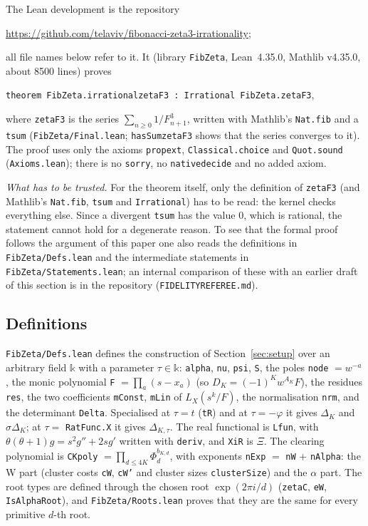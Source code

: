 \documentclass[11pt]{amsart}
\theoremstyle{definition}
\theoremstyle{remark}
\numberwithin{equation}{section}
\newcommand{\lean}[1]{{\def\_{\textunderscore\allowbreak}\texttt{#1}}}
\begin{document}
The Lean development is the repository
\begin{center}
\url{https://github.com/telaviv/fibonacci-zeta3-irrationality};
\end{center}
all file names below refer to it. It (library \lean{FibZeta}, Lean~4.35.0, Mathlib v4.35.0, about 8500 lines) proves
\begin{center}
\lean{theorem FibZeta.irrational\_zetaF3 : Irrational FibZeta.zetaF3},
\end{center}
where \lean{zetaF3} is the series $\sum_{n\ge0}1/F_{n+1}^3$, written with Mathlib's \lean{Nat.fib} and a \lean{tsum}
(\lean{FibZeta/Final.lean}; \lean{hasSum\_zetaF3} shows that the series converges to it). The proof uses only the
axioms \lean{propext}, \lean{Classical.choice} and \lean{Quot.sound} (\lean{Axioms.lean}); there is no \lean{sorry},
no \lean{native\_decide} and no added axiom.

\emph{What has to be trusted.} For the theorem itself, only the definition of \lean{zetaF3} (and Mathlib's
\lean{Nat.fib}, \lean{tsum} and \lean{Irrational}) has to be read: the kernel checks everything else. Since a divergent
\lean{tsum} has the value $0$, which is rational, the statement cannot hold for a degenerate reason. To see that the
formal proof follows the argument of this paper one also reads the definitions in \lean{FibZeta/Defs.lean} and the
intermediate statements in \lean{FibZeta/Statements.lean}; an internal comparison of these with an earlier draft of
this section is in the repository (\lean{FIDELITY\_REFEREE.md}).

\subsection*{Definitions}
\lean{FibZeta/Defs.lean} defines the construction of Section~\ref{sec:setup} over an arbitrary field $\mathbb k$ with a
parameter $\tau\in\mathbb k$: \lean{alpha}, \lean{nu}, \lean{psi}, \lean{S}, the poles \lean{node} $=w^{-a}$, the monic
polynomial \lean{F} $=\prod_a(s-x_a)$ (so $D_K=(-1)^Kw^{A_K}F$), the residues \lean{res}, the two coefficients
\lean{mConst}, \lean{mLin} of $L_X(s^k/F)$, the normalisation \lean{nrm}, and the determinant \lean{Delta}.
Specialised at $\tau=t$ (\lean{tR}) and at $\tau=-\varphi$ it gives $\Delta_K$ and $\sigma\Delta_K$; at
$\tau=$ \lean{RatFunc.X} it gives $\Delta_{K,\tau}$. The real functional is \lean{Lfun}, with
$\theta(\theta+1)g=s^2g''+2sg'$ written with \lean{deriv}, and \lean{XiR} is $\Xi$. The clearing polynomial is
\lean{CKpoly} $=\prod_{d\le4K}\Phi_d^{b_{K,d}}$, with exponents \lean{nExp} $=$ \lean{nW} $+$ \lean{nAlpha}: the W part
(cluster costs \lean{cW}, \lean{cW'} and cluster sizes \lean{clusterSize}) and the $\alpha$ part. The root types are
defined through the chosen root $\exp(2\pi i/d)$ (\lean{zetaC}, \lean{eW}, \lean{IsAlphaRoot}), and
\lean{FibZeta/Roots.lean} proves that they are the same for every primitive $d$-th root.
\end{document}

